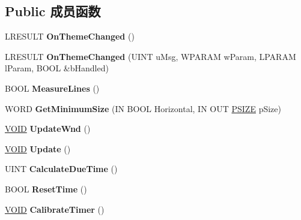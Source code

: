 \subsection*{Public 成员函数}
\begin{DoxyCompactItemize}
\item 
\mbox{\label{class_c_tray_clock_wnd_a1929e5c49c9df78e317a881403386ea4}} 
L\+R\+E\+S\+U\+LT {\bfseries On\+Theme\+Changed} ()
\item 
\mbox{\label{class_c_tray_clock_wnd_a23ab925d7eb4713296390194ebba2cf1}} 
L\+R\+E\+S\+U\+LT {\bfseries On\+Theme\+Changed} (U\+I\+NT u\+Msg, W\+P\+A\+R\+AM w\+Param, L\+P\+A\+R\+AM l\+Param, B\+O\+OL \&b\+Handled)
\item 
\mbox{\label{class_c_tray_clock_wnd_a1c9a3c1015bb0c23fa4a780371dac4a6}} 
B\+O\+OL {\bfseries Measure\+Lines} ()
\item 
\mbox{\label{class_c_tray_clock_wnd_ad19301c4c0673e7ea5d270cb75573a8f}} 
W\+O\+RD {\bfseries Get\+Minimum\+Size} (IN B\+O\+OL Horizontal, IN O\+UT \hyperlink{structtag_s_i_z_e}{P\+S\+I\+ZE} p\+Size)
\item 
\mbox{\label{class_c_tray_clock_wnd_a510745d6ebf477b00230aa37c8b2ac6a}} 
\hyperlink{interfacevoid}{V\+O\+ID} {\bfseries Update\+Wnd} ()
\item 
\mbox{\label{class_c_tray_clock_wnd_a4eb0b4a4d3bb0760ccf7791e18cc3f65}} 
\hyperlink{interfacevoid}{V\+O\+ID} {\bfseries Update} ()
\item 
\mbox{\label{class_c_tray_clock_wnd_a58e0de253198233aa2f046aa94294f07}} 
U\+I\+NT {\bfseries Calculate\+Due\+Time} ()
\item 
\mbox{\label{class_c_tray_clock_wnd_aabd1dd1ba087de6b5f45e140b3c7c083}} 
B\+O\+OL {\bfseries Reset\+Time} ()
\item 
\mbox{\label{class_c_tray_clock_wnd_a3d1f4b6939369b56ebff527066de9e41}} 
\hyperlink{interfacevoid}{V\+O\+ID} {\bfseries Calibrate\+Timer} ()
\item 

\end{DoxyCompactItemize}
